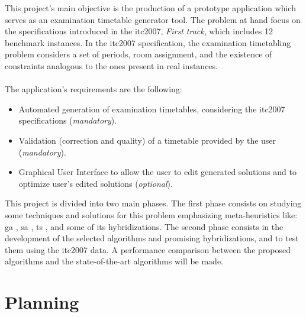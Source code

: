 This project's main objective is the production of a prototype application which serves as an examination timetable generator tool. The problem at hand focus on the specifications introduced in the \gls{itc2007}, \textit{First track}, which includes 12 benchmark instances. In the \gls{itc2007} specification, the examination timetabling problem considers a set of periods, room assignment, and the existence of constraints analogous to the ones present in real instances.\\
\\
The application's requirements are the following:
\begin{itemize}
	\item Automated generation of examination timetables, considering the \gls{itc2007} specifications (\textit{mandatory}).
	\item Validation (correction and quality) of a timetable provided by the user (\textit{mandatory}).
	\item Graphical User Interface to allow the user to edit generated solutions and to optimize user's edited solutions (\textit{optional}).
\end{itemize}
This project is divided into two main phases. The first phase consists on studying some techniques and solutions for this problem emphasizing meta-heuristics like: \gls{ga} \cite{Abdullah2012}, \gls{sa} \cite{Kirkpatrick1983}, \gls{ts} \cite{Smet2007}, and some of its hybridizations. The second phase consists in the development of the selected algorithms and promising hybridizations, and to test them using the \gls{itc2007} data. A performance comparison between the proposed algorithms and the state-of-the-art algorithms will be made.

\section{Planning}

